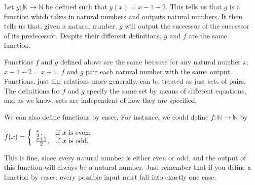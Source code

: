 \documentclass[open-logic-section]{subfiles}
\begin{document}
\begin{ex}
Let $g: \mathbb{N} \rightarrow \mathbb{N}$ be defined such that $g(x) = x-1+2$. This tells us that $g$ is a function which takes in natural numbers and outputs natural numbers. It then tells us that, given a natural number, $g$ will output the successor of the successor of its predecessor. Despite their different definitions, $g$ and $f$ are the same function.
\end{ex}

\begin{wordy}
Functions $f$ and $g$ defined above are the same because for any natural number $x$, $x-1+2 = x+1$. $f$ and $g$ pair each natural number with the same output. Functions, just like relations more generally, can be treated as just sets of pairs. The definitions for $f$ and $g$ specify the same set by means of different equations, and as we know, sets are independent of how they are specified.
\end{wordy}

\begin{ex}
We can also define functions by cases. For instance, we could define
    $f: \mathbb{N} \rightarrow \mathbb{N}$  by 

$f(x) = \left\{
                                                \begin{array}{ll}
                                                  \frac{x}{2}, & \hbox{if $x$ is even;} \\
                                                  \frac{x+1}{2}, & \hbox{if $x$ is odd.}
                                                \end{array}
                                              \right.$

This is fine, since every natural number is either even or odd, and the output of this function will always be a natural number. Just remember that if you define a function by cases, every possible input must fall into exactly one case.
\end{ex}
\end{document}
